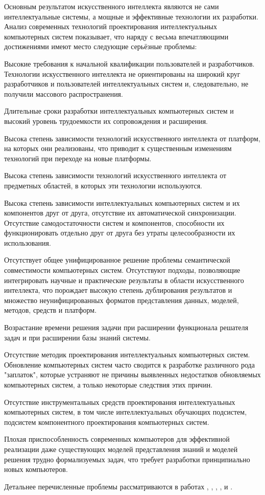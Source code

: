 \begin{partbacktext}
Основным результатом искусственного интеллекта являются не сами интеллектуальные системы, а мощные и эффективные технологии их разработки. Анализ современных технологий проектирования интеллектуальных компьютерных систем показывает, что наряду с весьма впечатляющими достижениями имеют место следующие серьёзные проблемы:
\begin{textitemize}
	\item Высокие требования к начальной квалификации пользователей и разработчиков. Технологии искусственного интеллекта не ориентированы на широкий круг разработчиков и пользователей интеллектуальных систем и, следовательно, не получили массового распространения.
	\item Длительные сроки разработки интеллектуальных компьютерных систем и высокий уровень трудоемкости их сопровождения и расширения.
	\item Высока степень зависимости технологий искусственного интеллекта от платформ, на которых они реализованы, что приводит к существенным изменениям технологий при переходе на новые платформы.
	\item Высока степень зависимости технологий искусственного интеллекта от предметных областей, в которых эти технологии используются.
	\item Высока степень зависимости интеллектуальных компьютерных систем и их компонентов друг от друга, отсутствие их автоматической синхронизации. Отсутствие самодостаточности систем и компонентов, способности их функционировать отдельно друг от друга без утраты целесообразности их использования.
	\item Отсутствует общее унифицированное решение проблемы семантической совместимости компьютерных систем. Отсутствуют подходы, позволяющие интегрировать научные и практические результаты в области искусственного интеллекта, что порождает высокую степень дублирования результатов и множество неунифицированных форматов представления данных, моделей, методов, средств и платформ.
	\item Возрастание времени решения задачи при расширении функционала решателя задач и при расширении базы знаний системы.
	\item Отсутствие методик проектирования интеллектуальных компьютерных систем. Обновление компьютерных систем часто сводится к разработке	различного рода "заплаток"{}, которые устраняют не причины выявленных недостатков обновляемых компьютерных систем, а только некоторые следствия этих причин.
	\item Отсутствие инструментальных средств проектирования интеллектуальных компьютерных систем, в том числе интеллектуальных обучающих подсистем, подсистем компонентного проектирования компьютерных систем.
	\item Плохая приспособленность современных компьютеров для эффективной реализации даже существующих моделей представления знаний и моделей решения трудно формализуемых задач, что требует разработки принципиально новых компьютеров.
\end{textitemize}
Детальнее перечисленные проблемы рассматриваются в работах , , , ,  и .


\end{partbacktext}
